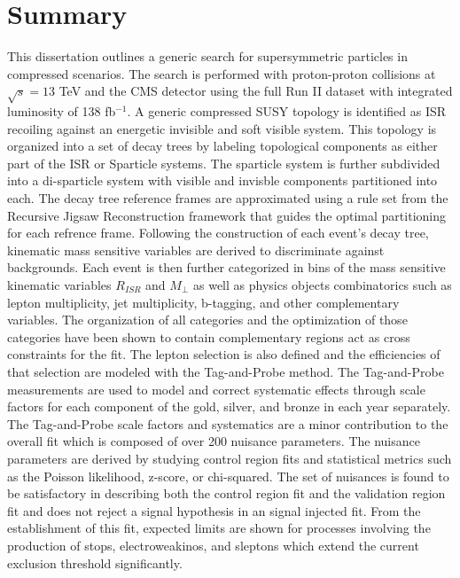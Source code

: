 \setcounter{secnumdepth}{3}
\setcounter{tocdepth}{3}
\setlength{\parskip}{\smallskipamount}
\setlength{\parindent}{0pt}


\makeatletter


\providecommand{\tabularnewline}{\\}


\makeatother


\chapter{Summary}


This dissertation outlines a generic search for supersymmetric particles in compressed scenarios. The search is performed with proton-proton collisions at $\sqrt{s} = 13$ TeV and the CMS detector using the full Run II dataset with integrated luminosity of 138 fb$^{-1}$. A generic compressed SUSY topology is identified as ISR recoiling against an energetic invisible and soft visible system. This topology is organized into a set of decay trees by labeling topological components as either part of the ISR or Sparticle systems. The sparticle system is further subdivided into a di-sparticle system with visible and invisble components partitioned into each. The decay tree reference frames are approximated using a rule set from the Recursive Jigsaw Reconstruction framework that guides the optimal partitioning for each refrence frame. Following the construction of each event's decay tree, kinematic mass sensitive variables are derived to discriminate against backgrounds. Each event is then further categorized in bins of the mass sensitive kinematic variables $R_{ISR}$ and $M_\perp$ as well as physics objects combinatorics such as lepton multiplicity, jet multiplicity, b-tagging, and other complementary variables. The organization of all categories and the optimization of those categories have been shown to contain complementary regions act as cross constraints for the fit. The lepton selection is also defined and the efficiencies of that selection are modeled with the Tag-and-Probe method. The Tag-and-Probe measurements are used to  model and correct systematic effects through scale factors for each component of the gold, silver, and bronze in each year separately. The Tag-and-Probe scale factors and systematics are a minor contribution to the overall fit which is composed of over 200 nuisance parameters. The nuisance parameters are derived by studying control region fits and statistical metrics such as the Poisson likelihood, z-score, or chi-squared. The set of nuisances is found to be satisfactory in describing both the control region fit and the validation region fit and does not reject a signal hypothesis in an signal injected fit. From the establishment of this fit, expected limits are shown for processes involving the production of stops, electroweakinos, and sleptons which extend the current exclusion threshold significantly.   

